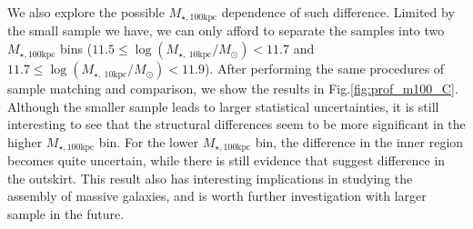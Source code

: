 \documentclass{emulateapj}
\def\mtot{{$M_{\star,100\mathrm{kpc}}$}}
\begin{document}
\begin{CJK*}{UTF8}{gbsn}
    We also explore the possible \mtot{} dependence of such difference.  
    Limited by the small sample we have, we can only afford to separate the 
    samples into two \mtot{} bins 
    ($11.5 \leq \log (M_{\star,\ 10\mathrm{kpc}}/M_{\odot}) < 11.7$ and 
     $11.7 \leq \log (M_{\star,\ 10\mathrm{kpc}}/M_{\odot}) < 11.9$).  
    After performing the same procedures of sample matching and comparison, 
    we show the results in Fig.\ref{fig:prof_m100_C}.  
    Although the smaller sample leads to larger statistical uncertainties, 
    it is still interesting to see that the structural differences seem to 
    be more significant in the higher \mtot{} bin.  
    For the lower \mtot{} bin, the difference in the inner region becomes quite 
    uncertain, while there is still evidence that suggest difference in the 
    outskirt.  
    This result also has interesting implications in studying the assembly 
    of massive galaxies, and is worth further investigation with larger sample
    in the future.  



\end{CJK*}
\end{document}

